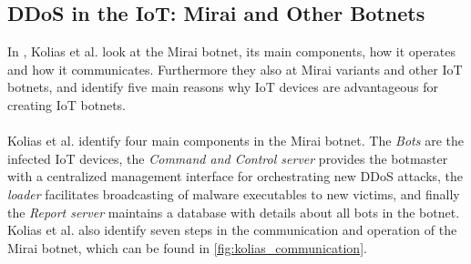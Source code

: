 \documentclass[a4paper,10pt]{article}
\begin{document}
\subsection{{DDoS} in the {IoT}: Mirai and Other Botnets} \label{sec:literature_review:kolias2017}
In \cite{Kolias2017}, Kolias et al. look at the Mirai botnet, its main components, how it operates and how it communicates.
Furthermore they also at Mirai variants and other IoT botnets, and identify five main reasons why IoT devices are
advantageous for creating IoT botnets.
\\\\
Kolias et al. identify four main components in the Mirai botnet. The \textit{Bots} are the infected IoT devices, the 
\textit{Command and Control server} provides the botmaster with a centralized management interface for 
orchestrating new DDoS attacks, the \textit{loader} facilitates broadcasting of malware executables to new victims, and
finally the \textit{Report server} maintains a database with details about all bots in the botnet. Kolias et al. also identify 
seven steps in the communication and operation of the Mirai botnet, which can be found in \autoref{fig:kolias_communication}.
\end{document}
